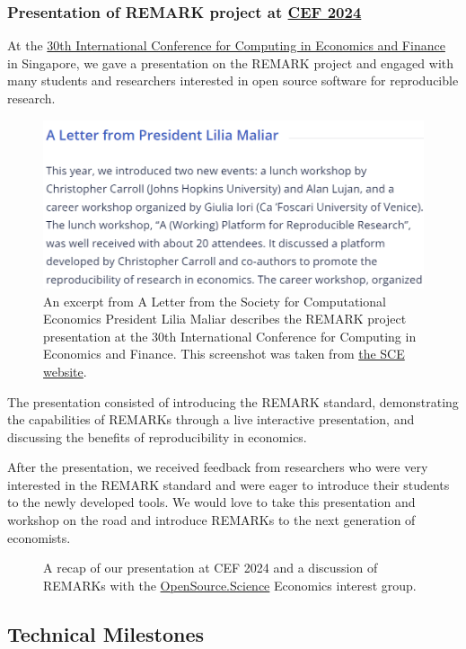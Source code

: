 \documentclass{article}
\begin{document}
\subsubsection{Presentation of REMARK project at \href{https://comp-econ.com/30th-conference/}{CEF 2024}}

At the \href{https://comp-econ.com/30th-conference/}{30th International Conference for Computing in Economics and Finance} in Singapore, we gave a presentation on the REMARK project and engaged with many students and researchers interested in open source software for reproducible research.

\begin{figure}[!htbp]
\centering
\includegraphics[width=0.7\linewidth]{files/sce_letter-993ec031415bd0f59891923fd6d8184d.png}
\caption*{An excerpt from A Letter from the Society for Computational Economics President Lilia Maliar describes the REMARK project presentation at the 30th International Conference for Computing in Economics and Finance. This screenshot was taken from \href{https://comp-econ.com/}{the SCE website}.}
\end{figure}

The presentation consisted of introducing the REMARK standard, demonstrating the capabilities of REMARKs through a live interactive presentation, and discussing the benefits of reproducibility in economics.

After the presentation, we received feedback from researchers who were very interested in the REMARK standard and were eager to introduce their students to the newly developed tools. We would love to take this presentation and workshop on the road and introduce REMARKs to the next generation of economists.

\begin{figure}[!htbp]
\centering
\caption*{A recap of our presentation at CEF 2024 and a discussion of REMARKs with the \href{https://opensource.science/}{OpenSource.Science} Economics interest group.}
\end{figure}

\subsection{Technical Milestones}
\end{document}
